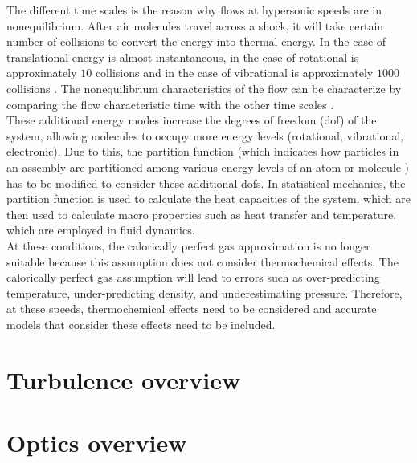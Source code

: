         The different time scales is the reason why flows at hypersonic
        speeds are in nonequilibrium. After air molecules travel across a
        shock, it will take certain number of collisions to convert the
        energy into thermal energy. In the case of translational energy is
        almost instantaneous, in the case of rotational is approximately $10$
        collisions and in the case of vibrational is approximately $1000$
        collisions \cite{Vincenti1975}. The nonequilibrium
        characteristics of the flow can be characterize by comparing the flow
        characteristic time with the other time scales \cite{Neitzel2017}. \\

        These additional energy modes increase the degrees of freedom (dof) of the system, allowing molecules to occupy more energy levels (rotational, vibrational, electronic). Due to this, the partition function (which indicates how particles in an assembly are partitioned among various energy levels of an atom or molecule \cite{Laurendeau2005}) has to be modified to consider these additional dofs. In statistical mechanics, the partition function is used to calculate the heat capacities of the system, which are then used to calculate macro properties such as heat transfer and temperature, which are employed in fluid dynamics.  \\

      At these conditions, the calorically perfect gas approximation is no
      longer suitable because this assumption does not consider thermochemical
      effects. The calorically perfect gas assumption will lead to errors such
      as over-predicting temperature, under-predicting density, and
      underestimating pressure. Therefore, at these speeds, thermochemical effects need to be considered and accurate models that consider these effects need to be included. \\

\section{Turbulence overview\label{section:turbulenceOverview}}

\section{Optics overview \label{section:opticsOverview}}

